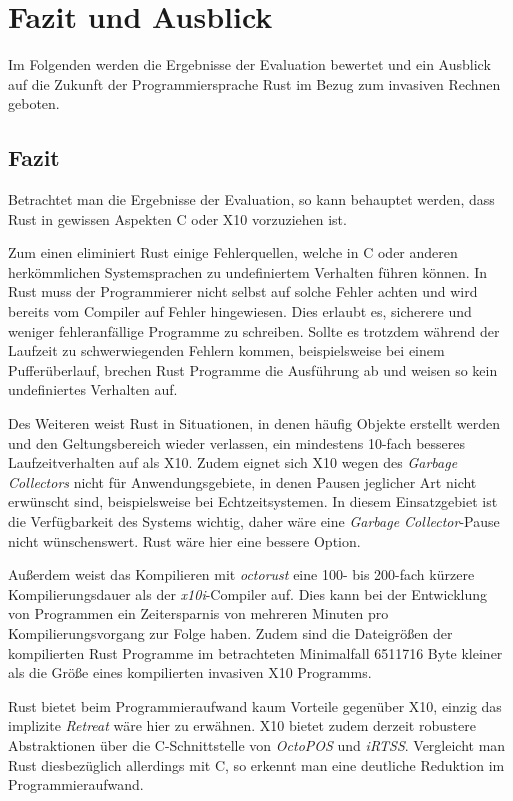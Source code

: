 \chapter{Fazit und Ausblick}\label{sec:conclusion}

Im Folgenden werden die Ergebnisse der Evaluation bewertet
und ein Ausblick auf die Zukunft der Programmiersprache Rust im Bezug zum invasiven Rechnen geboten.

\section{Fazit}

Betrachtet man die Ergebnisse der Evaluation, so kann behauptet werden,
dass Rust in gewissen Aspekten C oder X10 vorzuziehen ist.

Zum einen eliminiert Rust einige Fehlerquellen, welche in C oder anderen herkömmlichen
Systemsprachen zu undefiniertem Verhalten führen können.
In Rust muss der Programmierer nicht selbst auf solche Fehler achten und wird bereits vom Compiler auf Fehler
hingewiesen. Dies erlaubt es, sicherere und weniger fehleranfällige Programme zu schreiben.
Sollte es trotzdem während der Laufzeit zu schwerwiegenden Fehlern kommen, beispielsweise bei einem Pufferüberlauf,
brechen Rust Programme die Ausführung ab und weisen so kein undefiniertes Verhalten auf.

Des Weiteren weist Rust in Situationen, in denen häufig Objekte erstellt werden und den Geltungsbereich wieder verlassen,
ein mindestens 10-fach besseres Laufzeitverhalten auf als X10.
Zudem eignet sich X10 wegen des \textit{Garbage Collectors}
nicht für Anwendungsgebiete, in denen Pausen jeglicher Art nicht erwünscht sind,
beispielsweise bei Echtzeitsystemen.
In diesem Einsatzgebiet ist die Verfügbarkeit des Systems wichtig, daher wäre eine \textit{Garbage Collector}-Pause
nicht wünschenswert. Rust wäre hier eine bessere Option.

Außerdem weist das Kompilieren mit \textit{octorust} eine 100- bis 200-fach kürzere Kompilierungsdauer
als der \textit{x10i}-Compiler auf. Dies kann bei der Entwicklung von Programmen ein Zeitersparnis von
mehreren Minuten pro Kompilierungsvorgang zur Folge haben. 
Zudem sind die Dateigrößen der kompilierten Rust Programme im betrachteten Minimalfall 6511716 Byte kleiner
als die Größe eines kompilierten invasiven X10 Programms.

Rust bietet beim Programmieraufwand kaum Vorteile gegenüber X10, einzig das implizite \textit{Retreat} wäre hier zu 
erwähnen.
X10 bietet zudem derzeit robustere Abstraktionen über die C-Schnittstelle von \textit{OctoPOS} und
\textit{iRTSS}.
Vergleicht man Rust diesbezüglich allerdings mit C, so erkennt man eine deutliche Reduktion im Programmieraufwand.

